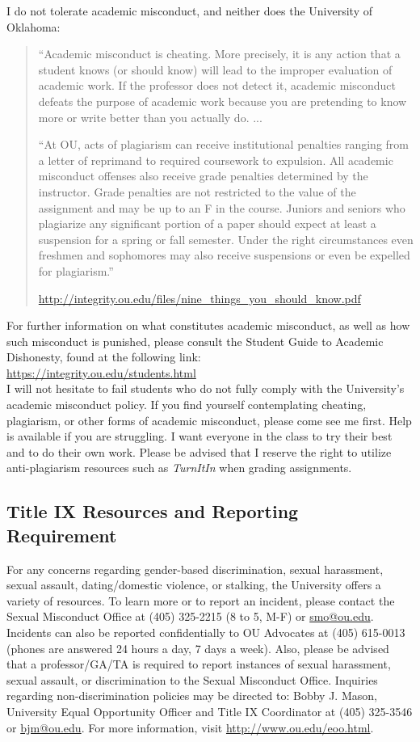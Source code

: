 \documentclass[11pt,english]{article}
\begin{document}
I do not tolerate academic misconduct, and neither does the University of Oklahoma: 
\begin{quotation}
``Academic misconduct is cheating. More precisely, it is any action that a student knows (or should know) will lead to the improper evaluation of academic work. If the professor does not detect it, academic misconduct defeats the purpose of academic work because you are pretending to know more or write better than you actually do. ... 

``At OU, acts of plagiarism can receive institutional penalties ranging from a letter of reprimand to required coursework to expulsion. All academic misconduct offenses also receive grade penalties determined by the instructor. Grade penalties are not restricted to the value of the assignment and may be up to an F in the course. Juniors and seniors who plagiarize any significant portion of a paper should expect at least a suspension for a spring or fall semester. Under the right circumstances even freshmen and sophomores may also receive suspensions or even be expelled for plagiarism.'' 

\textemdash \url{http://integrity.ou.edu/files/nine_things_you_should_know.pdf}
\end{quotation}
For further information on what constitutes academic misconduct, as well as how such misconduct is punished, please consult the Student Guide to Academic Dishonesty, found at the following link:\\ \url{https://integrity.ou.edu/students.html}\\

I will not hesitate to fail students who do not fully comply with the University's academic misconduct policy. If you find yourself contemplating cheating, plagiarism, or other forms of academic misconduct, please come see me first. Help is available if you are struggling. I want everyone in the class to try their best and to do their own work. Please be advised that I reserve the right to utilize anti-plagiarism resources such as \emph{TurnItIn} when grading assignments.

\subsection*{Title IX Resources and Reporting Requirement}

For any concerns regarding gender-based discrimination, sexual harassment, sexual assault, dating/domestic violence, or stalking, the University offers a variety of resources. To learn more or to report an incident, please contact the Sexual Misconduct Office at (405) 325-2215 (8 to 5, M-F) or \href{mailto:smo@ou.edu}{smo@ou.edu}. Incidents can also be reported confidentially to OU Advocates at (405) 615-0013 (phones are answered 24 hours a day, 7 days a week). Also, please be advised that a professor/GA/TA is required to report instances of sexual harassment, sexual assault, or discrimination to the Sexual Misconduct Office. Inquiries regarding non-discrimination policies may be directed to: Bobby J. Mason, University Equal Opportunity Officer and Title IX Coordinator at (405) 325-3546 or \href{mailto:bjm@ou.edu}{bjm@ou.edu}. For more information, visit \url{http://www.ou.edu/eoo.html}.
\end{document}
